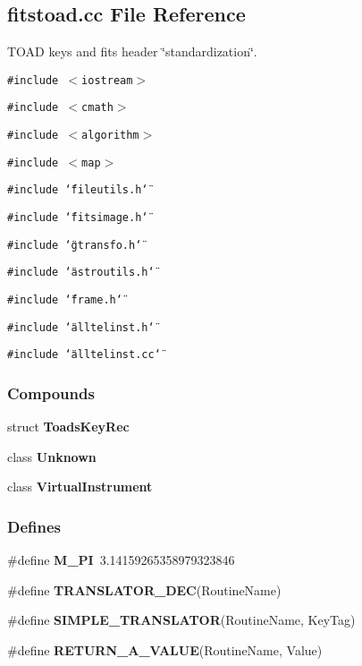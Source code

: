 \subsection{fitstoad.cc File Reference}
\label{fitstoad_cc}
TOAD keys and fits header \char`\"{}standardization\char`\"{}. 


{\tt \#include $<$iostream$>$}\par
{\tt \#include $<$cmath$>$}\par
{\tt \#include $<$algorithm$>$}\par
{\tt \#include $<$map$>$}\par
{\tt \#include \char`\"{}fileutils.h\char`\"{}}\par
{\tt \#include \char`\"{}fitsimage.h\char`\"{}}\par
{\tt \#include \char`\"{}gtransfo.h\char`\"{}}\par
{\tt \#include \char`\"{}astroutils.h\char`\"{}}\par
{\tt \#include \char`\"{}frame.h\char`\"{}}\par
{\tt \#include \char`\"{}alltelinst.h\char`\"{}}\par
{\tt \#include \char`\"{}alltelinst.cc\char`\"{}}\par
\subsubsection*{Compounds}
\begin{CompactItemize}
\item 
struct {\bf Toads\-Key\-Rec}
\item 
class {\bf Unknown}
\item 
class {\bf Virtual\-Instrument}
\end{CompactItemize}
\subsubsection*{Defines}
\begin{CompactItemize}
\item 
{}
\#define {\bf M\_\-PI}\ 3.14159265358979323846\label{fitstoad_cc_a0}

\item 
\#define {\bf TRANSLATOR\_\-DEC}(Routine\-Name)
\item 
\#define {\bf SIMPLE\_\-TRANSLATOR}(Routine\-Name, Key\-Tag)
\item 
\#define {\bf RETURN\_\-A\_\-VALUE}(Routine\-Name, Value)
\end{CompactItemize}
